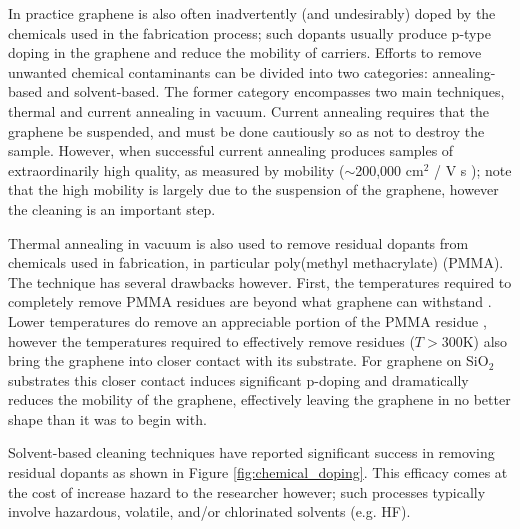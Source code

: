 \documentclass[edeposit,fullpage,draftthesis]{uiucthesis2009}
\begin{document}
        In practice graphene is also often inadvertently (and undesirably) doped by the chemicals
        used in the fabrication process; such dopants usually produce
        p-type doping in the graphene and reduce the mobility of carriers. 
        Efforts to remove unwanted chemical contaminants can be divided into two categories:
        annealing-based and solvent-based. The former category encompasses two main techniques,
        thermal \cite{pirkle2011effect, lin2011graphene} and current \cite{bolotin2008ultrahigh}
        annealing in vacuum. Current annealing requires that the graphene be suspended, and
        must be done cautiously so as not to destroy the sample. However, when successful current annealing produces
        samples of extraordinarily high quality, as measured by mobility ($\sim$200,000 cm$^2$ / V s \cite{bolotin2008ultrahigh});
        note that the high mobility is largely due to the suspension of the graphene, however the 
        cleaning is an important step.
        
        Thermal annealing in vacuum is also used to remove residual dopants from chemicals used in fabrication, in particular
        poly(methyl methacrylate) (PMMA). The technique has several drawbacks however. First, the temperatures
        required to completely remove PMMA residues are beyond what graphene can withstand \cite{lin2011graphene}.
        Lower temperatures do remove an appreciable portion of the PMMA residue \cite{pirkle2011effect}, 
        however the temperatures required to effectively remove residues ($T > 300$K) also bring the graphene
        into closer contact with its substrate. For graphene on SiO$_2$ substrates this closer contact induces
        significant p-doping and dramatically reduces the mobility of the graphene, effectively leaving
        the graphene in no better shape than it was to begin with.
        
        Solvent-based cleaning techniques have reported significant success in removing residual dopants 
        \cite{liang2011toward} as shown in Figure \ref{fig:chemical_doping}. This efficacy comes at
        the cost of increase hazard to the researcher however;
        such processes typically involve hazardous, volatile, and/or chlorinated solvents (e.g. HF).
        
\end{document}

